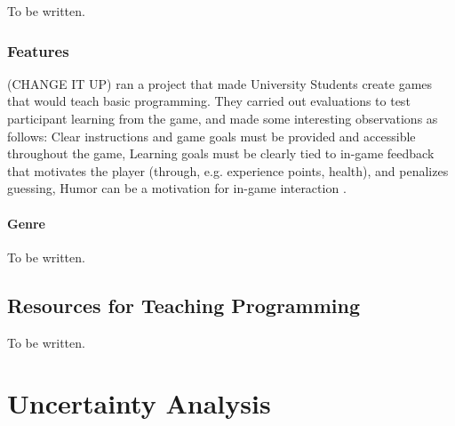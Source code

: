 \documentclass[a4paper,11.5pt]{report}
\numberwithin{figure}{section}
\numberwithin{table}{section}
\numberwithin{equation}{section}
\numberwithin{equation}{section}
\newcommand\blankpage{%
    \null
    \thispagestyle{empty}%
    \addtocounter{page}{-1}%
    \newpage}
\begin{document}
To be written.

\subsection{Features}

(CHANGE IT UP) \citeauthor{Barnes2007} ran a project that made University Students create games that would teach basic programming. They carried out evaluations to test participant learning from the game, and made some interesting observations as follows: Clear instructions and game goals must be provided and accessible throughout the game, Learning goals must be clearly tied to in-game feedback that motivates the player (through, e.g. experience points, health), and penalizes guessing, Humor can be a motivation for in-game interaction \cite{Barnes2007}.

\subsubsection{Genre}

To be written.

\section{Resources for Teaching Programming}

To be written.

\afterpage{\blankpage}






\appendix
{}
\appendixpage

\renewcommand\chaptername{Appendix}

\newpage
\chapter{Uncertainty Analysis} \label{app:errors}
\end{document}
